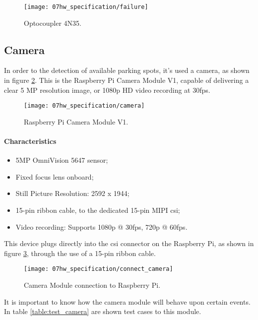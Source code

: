 \begin{figure}[H]
	\centering
	\texttt{[image: 07hw\_specification/failure]}
	\caption{Optocoupler 4N35.}
	\label{fig:failure}
\end{figure}

\subsection{Camera}
In order to the detection of available parking spots, it's used a camera, as shown in figure \ref{fig:camera}. This is the Raspberry Pi Camera Module V1, capable of delivering a clear 5 MP resolution image, or 1080p HD video recording at 30fps. \cite{camera}

\begin{figure}[H]
	\centering
	\texttt{[image: 07hw\_specification/camera]}
	\caption{Raspberry Pi Camera Module V1.}
	\label{fig:camera}
\end{figure}

\paragraph*{Characteristics}
\begin{itemize}
	\item 5MP OmniVision 5647 sensor;
	\item Fixed focus lens onboard;
	\item Still Picture Resolution: 2592 x 1944;
	\item 15-pin ribbon cable, to the dedicated 15-pin MIPI \ac{csi};
	\item Video recording: Supports 1080p @ 30fps, 720p @ 60fps.
\end{itemize}

\clearpage
{}
This device plugs directly into the \ac{csi} connector on the Raspberry Pi, as shown in figure \ref{fig:connect_camera}, through the use of a 15-pin ribbon cable.

\begin{figure}[ht]
	\centering
	\texttt{[image: 07hw\_specification/connect\_camera]}
	\caption{Camera Module connection to Raspberry Pi.}
	\label{fig:connect_camera}
\end{figure}

It is important to know how the camera module will behave upon certain events. In table \ref{table:test_camera} are shown test cases to this module.


